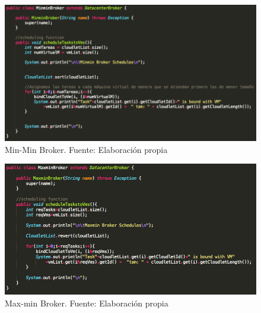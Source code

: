 \begin{figure}
	\caption{Min-Min Broker. Fuente: Elaboración propia}
	\centering
	\includegraphics[scale=0.5]{media/minmin_broker}
\end{figure}

\begin{figure}
	\caption{Max-min Broker. Fuente: Elaboración propia}
	\centering
	\includegraphics[scale=0.5]{media/maxmin_broker}
\end{figure}


